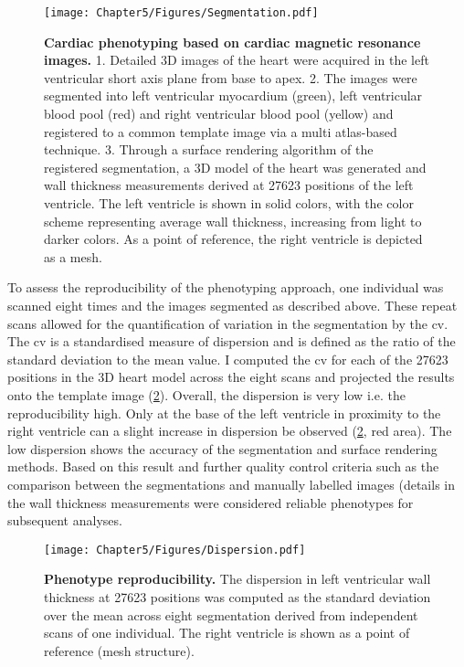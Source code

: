 \begin{figure}[h]
	\centering
	\texttt{[image: Chapter5/Figures/Segmentation.pdf]}
	\caption[\textbf{Cardiac phenotyping based on cardiac magnetic resonance images. }]{\textbf{Cardiac phenotyping based on cardiac magnetic resonance images. }1. Detailed 3D images of the heart were acquired in the left ventricular short axis plane from base to apex. 2. The images were segmented into left ventricular myocardium (green), left ventricular blood pool (red) and right ventricular blood pool (yellow) and registered to a common template image via a multi atlas-based technique. 3. Through a surface rendering algorithm of the registered segmentation, a 3D model of the heart was generated and wall thickness measurements derived at \num{27623} positions of the left ventricle. The left ventricle is shown in solid colors, with the color scheme representing average wall thickness, increasing from light to darker colors. As a point of reference, the right ventricle is depicted as a mesh.}
 	\label{fig:segmentation}
\end{figure}
%
To assess the reproducibility of the phenotyping approach, one individual was scanned eight times and the images segmented as described above. These repeat scans allowed for the quantification of variation in the segmentation by the \gls{cv}. The \gls{cv} is a standardised measure of dispersion and is defined as the ratio of the standard deviation to the mean value. I computed the \gls{cv} for each of the \num{27623} positions in the 3D heart model across the eight scans and projected the results onto the template image (\cref{fig:reproducibility}). Overall, the dispersion is very low i.e. the reproducibility high. Only at the base of the left ventricle in proximity to the right ventricle can a slight increase in dispersion be observed (\cref{fig:reproducibility}, red area). The low dispersion shows the accuracy of the segmentation and surface rendering methods. Based on this result and further quality control criteria such as the comparison between the segmentations and manually labelled images (details in \citep{deMarvao2014} the wall thickness measurements were considered reliable phenotypes for subsequent analyses. 
\\ 

\begin{figure}[h]
	\centering
	\texttt{[image: Chapter5/Figures/Dispersion.pdf]}
	\caption[\textbf{Phenotype reproducibility. }]{\textbf{Phenotype reproducibility. }The dispersion in left ventricular wall thickness at \num{27623} positions was computed as the standard deviation over the mean across eight segmentation derived from independent scans of one individual. The right ventricle is shown as a point of reference (mesh structure). }
 	\label{fig:reproducibility}
\end{figure}
%
